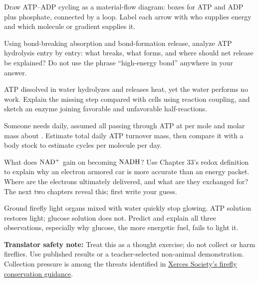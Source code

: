 \begin{sikaoti}
\item Draw ATP--ADP cycling as a material-flow diagram: boxes for ATP and ADP plus phosphate, connected by a loop. Label each arrow with who supplies energy and which molecule or gradient supplies it.
\item Using bond-breaking absorption and bond-formation release, analyze ATP hydrolysis entry by entry: what breaks, what forms, and where should net release be explained? Do not use the phrase ``high-energy bond'' anywhere in your answer.
\item ATP dissolved in water hydrolyzes and releases heat, yet the water performs no work. Explain the missing step compared with cells using reaction coupling, and sketch an enzyme joining favorable and unfavorable half-reactions.
\item Someone needs  daily, assumed all passing through ATP at  per mole and molar mass about . Estimate total daily ATP turnover mass, then compare it with a  body stock to estimate cycles per molecule per day.
\item What does $\mathrm{NAD^+}$ gain on becoming $\mathrm{NADH}$? Use Chapter 33's redox definition to explain why an electron armored car is more accurate than an energy packet. Where are the electrons ultimately delivered, and what are they exchanged for? The next two chapters reveal this; first write your guess.
\item Ground firefly light organs mixed with water quickly stop glowing. ATP solution restores light; glucose solution does not. Predict and explain all three observations, especially why glucose, the more energetic fuel, fails to light it.

\textbf{Translator safety note:} Treat this as a thought exercise; do not collect or harm fireflies. Use published results or a teacher-selected non-animal demonstration. Collection pressure is among the threats identified in \href{https://xerces.org/endangered-species-conservation/firefly-conservation}{Xerces Society's firefly conservation guidance}.
\end{sikaoti}
